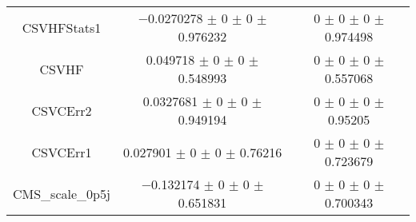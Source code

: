 \begin{table}
\begin{tabular}{ccc}
CSVHFStats1 & \num{-0.0270278} $\pm$ \num{0} $\pm$ \num{0} $\pm$ \num{0.976232} & \num{0} $\pm$ \num{0} $\pm$ \num{0} $\pm$ \num{0.974498}\\
CSVHF & \num{0.049718} $\pm$ \num{0} $\pm$ \num{0} $\pm$ \num{0.548993} & \num{0} $\pm$ \num{0} $\pm$ \num{0} $\pm$ \num{0.557068}\\
CSVCErr2 & \num{0.0327681} $\pm$ \num{0} $\pm$ \num{0} $\pm$ \num{0.949194} & \num{0} $\pm$ \num{0} $\pm$ \num{0} $\pm$ \num{0.95205}\\
CSVCErr1 & \num{0.027901} $\pm$ \num{0} $\pm$ \num{0} $\pm$ \num{0.76216} & \num{0} $\pm$ \num{0} $\pm$ \num{0} $\pm$ \num{0.723679}\\
CMS\_scale\_0p5j & \num{-0.132174} $\pm$ \num{0} $\pm$ \num{0} $\pm$ \num{0.651831} & \num{0} $\pm$ \num{0} $\pm$ \num{0} $\pm$ \num{0.700343}\\
\bottomrule
\end{tabular}
\end{table}